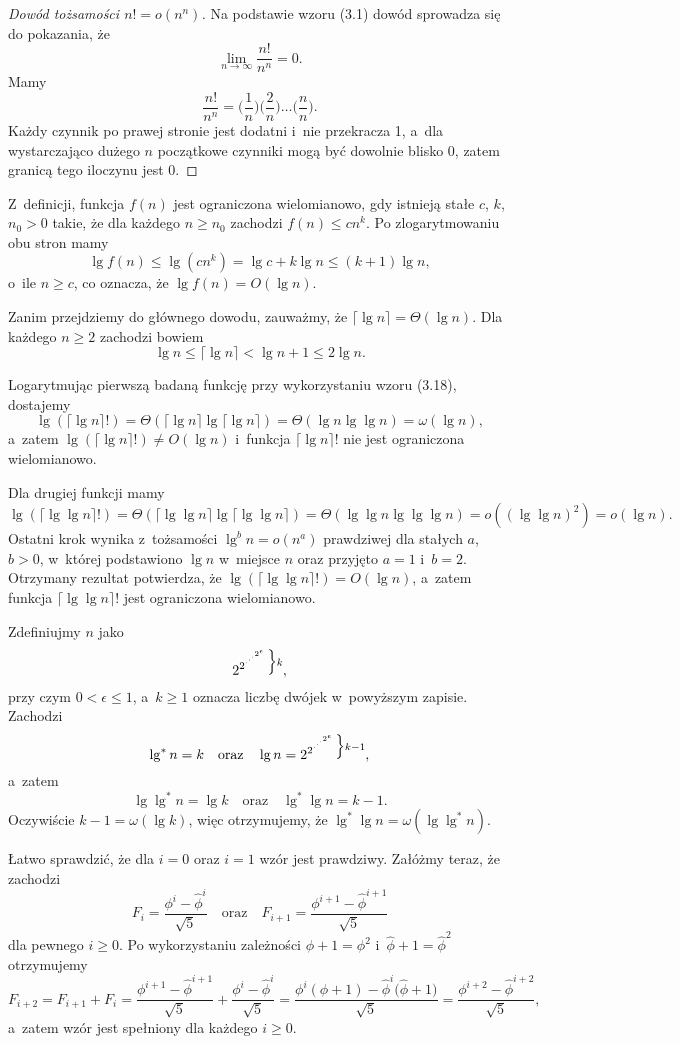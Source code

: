 \begin{proof}[Dowód tożsamości $n!=o(n^n)$]
	Na podstawie wzoru (3.1) dowód sprowadza się do pokazania, że
	\[
		\lim_{n\to\infty}\frac{n!}{n^n} = 0.
	\]
	Mamy
	\[
	    \frac{n!}{n^n} = \biggl(\frac{1}{n}\biggr)\biggl(\frac{2}{n}\biggr)\dots\biggl(\frac{n}{n}\biggr).
	\]
	Każdy czynnik po prawej stronie jest dodatni i~nie przekracza 1, a~dla wystarczająco dużego $n$ początkowe czynniki mogą być dowolnie blisko 0, zatem granicą tego iloczynu jest 0.
\end{proof}

\exercise %
Z~definicji, funkcja $f(n)$ jest ograniczona wielomianowo, gdy istnieją stałe $c$, $k$, $n_0>0$ takie, że dla każdego $n\ge n_0$ zachodzi $f(n)\le cn^k$.
Po zlogarytmowaniu obu stron mamy
\[
	\lg f(n) \le \lg(cn^k) = \lg c+k\lg n \le (k+1)\lg n,
\]
o~ile $n\ge c$, co oznacza, że $\lg f(n)=O(\lg n)$.

Zanim przejdziemy do głównego dowodu, zauważmy, że $\lceil\lg n\rceil=\Theta(\lg n)$.
Dla każdego $n\ge2$ zachodzi bowiem
\[
	\lg n \le \lceil\lg n\rceil < \lg n+1 \le 2\lg n.
\]

Logarytmując pierwszą badaną funkcję przy wykorzystaniu wzoru (3.18), dostajemy
\[
	\lg(\lceil\lg n\rceil!) = \Theta(\lceil\lg n\rceil\lg\lceil\lg n\rceil) = \Theta(\lg n\lg\lg n) = \omega(\lg n),
\]
a~zatem $\lg(\lceil\lg n\rceil!)\ne O(\lg n)$ i~funkcja $\lceil\lg n\rceil!$ nie jest ograniczona wielomianowo.

Dla drugiej funkcji mamy
\[
	\lg(\lceil\lg\lg n\rceil!) = \Theta(\lceil\lg\lg n\rceil\lg\lceil\lg\lg n\rceil) = \Theta(\lg\lg n\lg\lg\lg n) = o((\lg\lg n)^2) = o(\lg n).
\]
Ostatni krok wynika z~tożsamości $\lg^bn=o(n^a)$ prawdziwej dla stałych $a$, $b>0$, w~której podstawiono $\lg n$ w~miejsce $n$ oraz przyjęto $a=1$ i~$b=2$.
Otrzymany rezultat potwierdza, że $\lg(\lceil\lg\lg n\rceil!)=O(\lg n)$, a~zatem funkcja $\lceil\lg\lg n\rceil!$ jest ograniczona wielomianowo.

\exercise %
Zdefiniujmy $n$ jako
\[
    2^{2^{\cdot^{\cdot^{\cdot^{2^\epsilon}}}}}\vbox{\hbox{$\Big\}\scriptstyle k$}\kern0pt},
\]
przy czym $0<\epsilon\le1$, a~$k\ge1$ oznacza liczbę dwójek w~powyższym zapisie.
Zachodzi
\[
    \lg^*n=k \quad\text{oraz}\quad \lg n = 2^{2^{\cdot^{\cdot^{\cdot^{2^\epsilon}}}}}\vbox{\hbox{$\Big\}\scriptstyle k-1$}\kern0pt},
\]
a~zatem
\[
    \lg\lg^*n = \lg k \quad\text{oraz}\quad \lg^*\lg n = k-1.
\]
Oczywiście $k-1=\omega(\lg k)$, więc otrzymujemy, że $\lg^*\lg n=\omega(\lg\lg^*n)$.

\exercise %
Łatwo sprawdzić, że dla $i=0$ oraz $i=1$ wzór jest prawdziwy.
Załóżmy teraz, że zachodzi
\[
	F_i = \frac{\phi^i-\widehat\phi^i}{\sqrt{5}} \quad\text{oraz}\quad F_{i+1} = \frac{\phi^{i+1}-\widehat\phi^{i+1}}{\sqrt{5}}
\]
dla pewnego $i\ge0$.
Po wykorzystaniu zależności $\phi+1=\phi^2$ i~$\widehat\phi+1=\widehat\phi^2$ otrzymujemy
\[
	F_{i+2} = F_{i+1}+F_i = \frac{\phi^{i+1}-\widehat\phi^{i+1}}{\sqrt{5}}+\frac{\phi^i-\widehat\phi^i}{\sqrt{5}} = \frac{\phi^i(\phi+1)-\widehat\phi^i\bigl(\widehat\phi+1\bigr)}{\sqrt{5}} = \frac{\phi^{i+2}-\widehat\phi^{i+2}}{\sqrt{5}},
\]
a~zatem wzór jest spełniony dla każdego $i\ge0$.

